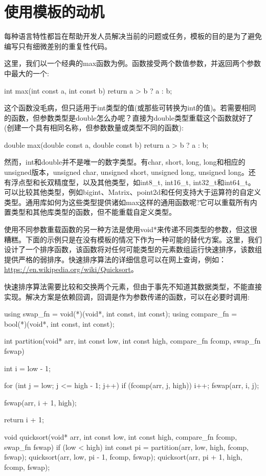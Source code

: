 \section{使用模板的动机}
每种语言特性都旨在帮助开发人员解决当前的问题或任务，模板的目的是为了避免编写只有细微差别的重复性代码。

这里，我们以一个经典的max函数为例。函数接受两个数值参数，并返回两个参数中最大的一个:

\begin{cpp}
int max(int const a, int const b)
{
	return a > b ? a : b;
}
\end{cpp}

这个函数没毛病，但只适用于int类型的值(或那些可转换为int的值)。若需要相同的函数，但参数类型是double怎么办呢？直接为double类型重载这个函数就好了(创建一个具有相同名称，但参数数量或类型不同的函数):

\begin{cpp}
double max(double const a, double const b)
{
	return a > b ? a : b;
}
\end{cpp}

然而，int和double并不是唯一的数字类型。有char, short, long, long和相应的unsigned版本，unsigned char, unsigned short, unsigned long, unsigned long。还有浮点型和长双精度型，以及其他类型，如int8\_t, int16\_t, int32\_t和int64\_t。可以比较其他类型，例如bigint、Matrix、point2d和任何支持大于运算符的自定义类型。通用库如何为这些类型提供诸如max这样的通用函数呢?它可以重载所有内置类型和其他库类型的函数，但不能重载自定义类型。

使用不同参数重载函数的另一种方法是使用void*来传递不同类型的参数，但这很糟糕。下面的示例只是在没有模板的情况下作为一种可能的替代方案。这里，我们设计了一个排序函数，该函数将对任何可能类型的元素数组运行快速排序，该数组提供严格的弱排序。快速排序算法的详细信息可以在网上查询，例如：\url{https://en.wikipedia.org/wiki/Quicksort}。

快速排序算法需要比较和交换两个元素，但由于事先不知道其数据类型，不能直接实现。解决方案是依赖回调，回调是作为参数传递的函数，可以在必要时调用:

\begin{cpp}
using swap_fn = void(*)(void*, int const, int const);
using compare_fn = bool(*)(void*, int const, int const);

int partition(void* arr, int const low, int const high,
			  compare_fn fcomp, swap_fn fswap)
{
	int i = low - 1;
	
	for (int j = low; j <= high - 1; j++)
	{
		if (fcomp(arr, j, high))
		{
			i++;
			fswap(arr, i, j);
		}
	}

	fswap(arr, i + 1, high);
	
	return i + 1;
}

void quicksort(void* arr, int const low, int const high,
			   compare_fn fcomp, swap_fn fswap)
{
	if (low < high)
	{
		int const pi = partition(arr, low, high, fcomp,
			fswap);
		quicksort(arr, low, pi - 1, fcomp, fswap);
		quicksort(arr, pi + 1, high, fcomp, fswap);
	}
}
\end{cpp}

